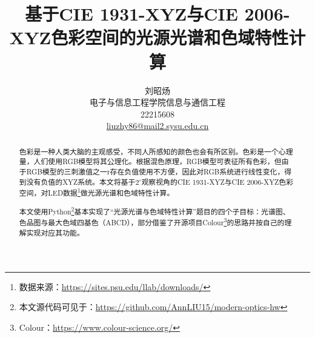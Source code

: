 \documentclass[fontset=windows]{article}
\title{基于CIE 1931-XYZ与CIE 2006-XYZ色彩空间的光源光谱和色域特性计算}
\author{%
    刘昭炀\\ %
    电子与信息工程学院\quad 信息与通信工程\\
    22215608\\
    \href{mailto:liuzhy86@mail2.sysu.edu.cn}{liuzhy86@mail2.sysu.edu.cn}\\
}
\begin{document}
\maketitle

\begin{abstract}
    \qquad 色彩是一种人类大脑的主观感受，不同人所感知的颜色也会有所区别。色彩是一个心理量，人们使用RGB模型将其公理化。根据混色原理，RGB模型可表征所有色彩，但由于RGB模型的三刺激值之一r存在负值使用不方便，因此对RGB系统进行线性变化，得到没有负值的XYZ系统。本文将基于$2^\circ$观察视角的CIE 1931-XYZ与CIE 2006-XYZ色彩空间，对LED数据\footnote{数据来源：\url{https://sites.psu.edu/llab/downloads/}}做光源光谱和色域特性计算。

    \qquad 本文使用Python\footnote{本文源代码可见于：\url{https://github.com/AnnLIU15/modern-optics-hw}}基本实现了``光源光谱与色域特性计算''题目的四个子目标：光谱图、色品图与最大色域四基色（ABCD），部分借鉴了开源项目Colour\footnote{Colour：\url{https://www.colour-science.org/}}的思路并按自己的理解实现对应其功能。
\end{abstract}

\begingroup
\let\clearpage\relax
\endgroup

\medskip
{\small{}

}{\small\par}
\end{document}
